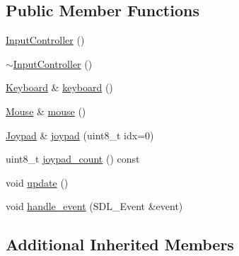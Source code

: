 \subsection*{Public Member Functions}
\begin{DoxyCompactItemize}
\item 
\hyperlink{classkglt_1_1_input_controller_a7276f285a134bd642a6dd8c86275a446}{Input\-Controller} ()
\item 
\hyperlink{classkglt_1_1_input_controller_a27b093d9783792caef05cd09db740347}{$\sim$\-Input\-Controller} ()
\item 
\hyperlink{classkglt_1_1_keyboard}{Keyboard} \& \hyperlink{classkglt_1_1_input_controller_a0652c5aec26be436ead2b7652a0979f9}{keyboard} ()
\item 
\hyperlink{classkglt_1_1_mouse}{Mouse} \& \hyperlink{classkglt_1_1_input_controller_ae922534e9ea0d7299b08c1163b4292fb}{mouse} ()
\item 
\hyperlink{classkglt_1_1_joypad}{Joypad} \& \hyperlink{classkglt_1_1_input_controller_a5fed0f678a39328543edc51ce862759e}{joypad} (uint8\-\_\-t idx=0)
\item 
uint8\-\_\-t \hyperlink{classkglt_1_1_input_controller_af0eef055e66549318911a139c166672d}{joypad\-\_\-count} () const 
\item 
void \hyperlink{classkglt_1_1_input_controller_a05491bcc26a67328ee8d13aefaffd493}{update} ()
\item 
void \hyperlink{classkglt_1_1_input_controller_a9b77691340c162295a6461eb03150a5e}{handle\-\_\-event} (S\-D\-L\-\_\-\-Event \&event)
\end{DoxyCompactItemize}
\subsection*{Additional Inherited Members}


